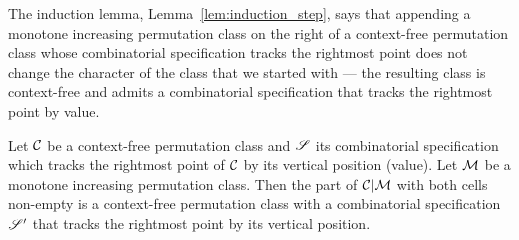 \documentclass[12pt, a4paper, twoside]{report}
\begin{document}
The induction lemma, Lemma~\ref{lem:induction_step}, says that appending a monotone increasing permutation class on the right of a context-free permutation class whose combinatorial specification tracks the rightmost point does not change the character of the class that we started with --- the resulting class is context-free and admits a combinatorial specification that tracks the rightmost point by value.
\begin{lemma}
  \label{lem:induction_step}
  Let $\mathcal{C}$ be a context-free permutation class and $\mathscr{S}$ its combinatorial specification which tracks the rightmost point of $\mathcal{C}$ by its vertical position (value). Let $\mathcal{M}$ be a monotone increasing permutation class. Then the part of $\mathcal{C}|\mathcal{M}$ with both cells non-empty is a context-free permutation class with a combinatorial specification $\mathscr{S}'$ that tracks the rightmost point by its vertical position.
\end{lemma}
\end{document}
